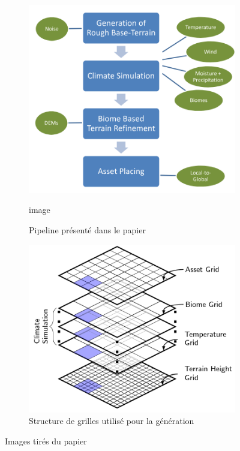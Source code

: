     \begin{figure}[!h]
    \centering
    \begin{subfigure}{0.4\linewidth}
        \centering
        \includegraphics[width=\linewidth]{images/pipeline_autobiomes.png}
        \caption{Pipeline présenté dans le papier}
        \label{fig:image_avant_expansion}image
    \end{subfigure}
    \hfill
    \begin{subfigure}{0.4\linewidth}
        \centering
        \includegraphics[width=\linewidth]{images/grille_autobiomes.png}
        \caption{Structure de grilles utilisé pour la génération}
        \label{fig:histo_avant_expansion}
    \end{subfigure}
    \caption{Images tirés du papier}
\end{figure}

